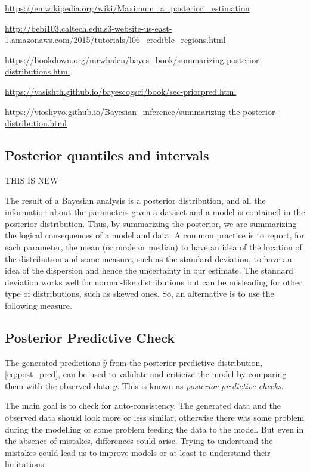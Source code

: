 \url{https://en.wikipedia.org/wiki/Maximum_a_posteriori_estimation}

\url{http://bebi103.caltech.edu.s3-website-us-east-1.amazonaws.com/2015/tutorials/l06_credible_regions.html}

\url{https://bookdown.org/mrwhalen/bayes_book/summarizing-posterior-distributions.html}

\url{https://vasishth.github.io/bayescogsci/book/sec-priorpred.html}

\url{https://vioshyvo.github.io/Bayesian_inference/summarizing-the-posterior-distribution.html}

\subsection{Posterior quantiles and intervals}




THIS IS NEW

The result of a Bayesian analysis is a posterior distribution, and all the information about the parameters given a dataset and a model is contained in the posterior distribution. Thus, by summarizing the posterior, we are summarizing the logical consequences of a model and data. A common practice is to report, for each parameter, the mean (or mode or median) to have an idea of the location of the distribution and some measure, such as the standard deviation, to have an idea of the dispersion and hence the uncertainty in our estimate. The standard deviation works well for normal-like distributions but can be misleading for other type of distributions, such as skewed ones. So, an alternative is to use the following measure.

\subsection{Posterior Predictive Check}

The generated predictions $\hat{y}$ from the posterior predictive distribution, \autoref{eq:post_pred}, can be used to validate and criticize the model by comparing them with the observed data $y$. This is known as \textit{posterior predictive checks}. 

The main goal is to check for auto-consistency. The generated data and the observed data should look more or less similar, otherwise there was some problem during the modelling or some problem feeding the data to the model. But even in the absence of mistakes, differences could arise. Trying to understand the mistakes could lead us to improve models or at least to understand their limitations.  

